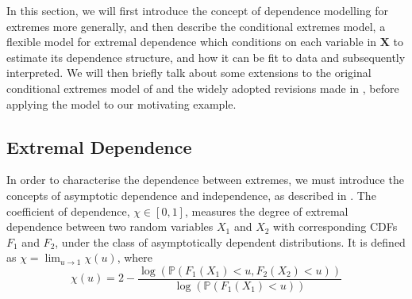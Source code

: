 \documentclass{article}
\numberwithin{equation}{section}
\begin{document}
In this section, we will first introduce the concept of dependence modelling for extremes more generally, and then describe the conditional extremes model, a flexible model for extremal dependence which conditions on each variable in $\bm{X}$ to estimate its dependence structure, and how it can be fit to data and subsequently interpreted.
We will then briefly talk about some extensions to the original conditional extremes model of \citet{Heffernan2004} and the widely adopted revisions made in \citet{Keef2013}, before applying the model to our motivating example.

\subsection{Extremal Dependence}

In order to characterise the dependence between extremes, we must introduce the concepts of asymptotic dependence and independence, as described in \citet{Coles1999}.
The coefficient of dependence, $\chi \in [0, 1]$, measures the degree of extremal dependence between two random variables $X_1$ and $X_2$ with corresponding CDFs $F_1$ and $F_2$, under the class of asymptotically dependent distributions.
It is defined as $\chi = \lim_{u \rightarrow 1}{\chi(u)}$, where
\[
\chi(u) = 2 - \frac{\log\left(\mathbb{P}(F_1(X_1) < u, F_2(X_2) < u)\right)}{\log \left(\mathbb{P}(F_1(X_1) < u)\right)}
\]
\end{document}
